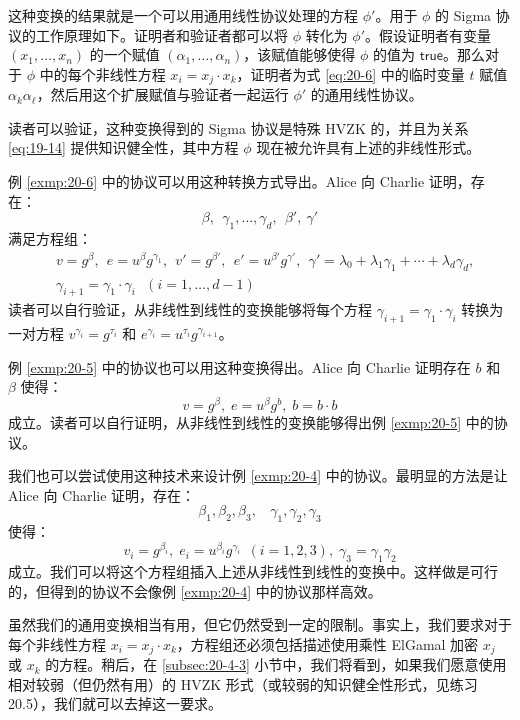 这种变换的结果就是一个可以用通用线性协议处理的方程 $\phi'$。用于 $\phi$ 的 Sigma 协议的工作原理如下。证明者和验证者都可以将 $\phi$ 转化为 $\phi'$。假设证明者有变量 $(x_1,\dots,x_n)$ 的一个赋值 $(\alpha_1,\dots,\alpha_n)$，该赋值能够使得 $\phi$ 的值为 $\mathsf{true}$。那么对于 $\phi$ 中的每个非线性方程 $x_i=x_j\cdot x_k$，证明者为式 \ref{eq:20-6} 中的临时变量 $t$ 赋值 $\alpha_k\alpha_\ell$，然后用这个扩展赋值与验证者一起运行 $\phi'$ 的通用线性协议。

读者可以验证，这种变换得到的 Sigma 协议是特殊 HVZK 的，并且为关系 \ref{eq:19-14} 提供知识健全性，其中方程 $\phi$ 现在被允许具有上述的非线性形式。

\begin{snote}[多项式计算.]
例 \ref{exmp:20-6} 中的协议可以用这种转换方式导出。Alice 向 Charlie 证明，存在：
$$
\beta,~~
\gamma_1,\dots,\gamma_d,~~
\beta',~
\gamma'
$$
满足方程组：
\begin{equation*}
\begin{aligned}
& v=g^\beta,~~
e=u^\beta g^{\gamma_1},~~
v'=g^{\beta'},~~
e'=u^{\beta'}g^{\gamma'},~~
\gamma'=\lambda_0+\lambda_1\gamma_1+\cdots+\lambda_d\gamma_d,\\
& \gamma_{i+1}=\gamma_1\cdot\gamma_i~~~(i=1,\dots,d-1)
\end{aligned}
\end{equation*}
读者可以自行验证，从非线性到线性的变换能够将每个方程 $\gamma_{i+1}=\gamma_1\cdot\gamma_i$ 转换为一对方程 $v^{\gamma_i}=g^{\tau_i}$ 和 $e^{\gamma_i}=u^{\tau_i}g^{\gamma_{i+1}}$。
\end{snote}

\begin{snote}[加密后的比特.]
例 \ref{exmp:20-5} 中的协议也可以用这种变换得出。Alice 向 Charlie 证明存在 $b$ 和 $\beta$ 使得：
$$
v=g^\beta,\;
e=u^\beta g^b,\;
b=b\cdot b
$$
成立。读者可以自行证明，从非线性到线性的变换能够得出例 \ref{exmp:20-5} 中的协议。
\end{snote}

\begin{snote}

我们也可以尝试使用这种技术来设计例 \ref{exmp:20-4} 中的协议。最明显的方法是让 Alice 向 Charlie 证明，存在：
$$
\beta_1,\beta_2,\beta_3,~~~~
\gamma_1,\gamma_2,\gamma_3
$$
使得：
$$
v_i=g^{\beta_i},\;
e_i=u^{\beta_i}g^{\gamma_i}~~(i=1,2,3),\;
\gamma_3=\gamma_1\gamma_2
$$
成立。我们可以将这个方程组插入上述从非线性到线性的变换中。这样做是可行的，但得到的协议不会像例 \ref{exmp:20-4} 中的协议那样高效。
\end{snote}

\begin{snote}[去除对非线性方程的约束.]
虽然我们的通用变换相当有用，但它仍然受到一定的限制。事实上，我们要求对于每个非线性方程 $x_i=x_j\cdot x_k$，方程组还必须包括描述使用乘性 ElGamal 加密 $x_j$ 或 $x_k$ 的方程。稍后，在 \ref{subsec:20-4-3} 小节中，我们将看到，如果我们愿意使用相对较弱（但仍然有用）的 HVZK 形式（或较弱的知识健全性形式，见练习 20.5），我们就可以去掉这一要求。
\end{snote}